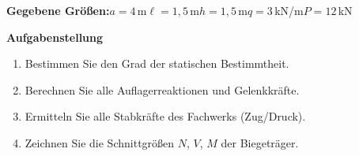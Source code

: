 \documentclass[a4paper,11pt]{article}
\begin{document}
\textbf{Gegebene Größen:}\quad $a=4$\,m\quad $\ell=1,5$\,m\quad $h=1,5$\,m\quad $q=3$\,kN/m\quad $P=12$\,kN
\par\medskip
\textbf{Aufgabenstellung}\par
\begin{enumerate}[label=\textbf{\arabic*.}]
  \item Bestimmen Sie den Grad der statischen Bestimmtheit.
  \item Berechnen Sie alle Auflagerreaktionen und Gelenkkräfte.
  \item Ermitteln Sie alle Stabkräfte des Fachwerks (Zug/Druck).
  \item Zeichnen Sie die Schnittgrößen $N$, $V$, $M$ der Biegeträger.
\end{enumerate}
\end{document}
